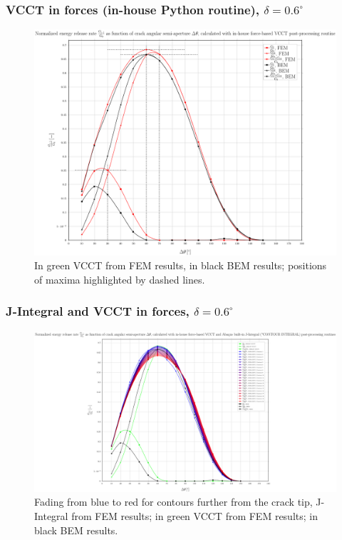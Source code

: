 \documentclass[first,firstsupp,lastsupp,handout,last,hyperref,table]{ETHclass}
\begin{document}
\begin{frame}
\frametitle{\small VCCT in forces (in-house Python routine), $\delta=0.6^{\circ}$}
\vspace{-0.5cm}
\centering
\captionsetup[figure]{font=scriptsize,labelfont=scriptsize}
\begin{figure}[!h]
\centering
\includegraphics[height=0.7\textheight]{2017-07-10_AbqRunSummary_SmallStrainD06_M-F-VCCT_Summary.pdf}
  \caption{\scriptsize In green VCCT from FEM results, in black BEM results; positions of maxima highlighted by dashed lines.}
  \label{fig:res1}
\end{figure}
\end{frame}

\begin{frame}
\frametitle{\small J-Integral and VCCT in forces, $\delta=0.6^{\circ}$}
\vspace{-0.5cm}
\centering
\captionsetup[figure]{font=scriptsize,labelfont=scriptsize}
\begin{figure}[!h]
\centering
\includegraphics[height=0.7\textheight]{2017-07-10_AbqRunSummary_SmallStrainD06_F-VCCT-JINT_Summary.pdf}
  \caption{\scriptsize Fading from blue to red for contours further from the crack tip, J-Integral from FEM results; in green VCCT from FEM results; in black BEM results.}
  \label{fig:res1}
\end{figure}
\end{frame}
\end{document}
